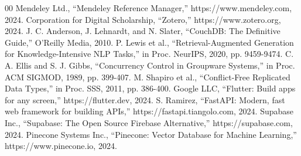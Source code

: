 \documentclass[conference]{IEEEtran}
\begin{document}
\begin{thebibliography}{00}
 Mendeley Ltd., ``Mendeley Reference Manager,'' https://www.mendeley.com, 2024.
 Corporation for Digital Scholarship, ``Zotero,'' https://www.zotero.org, 2024.
 J. C. Anderson, J. Lehnardt, and N. Slater, ``CouchDB: The Definitive Guide,'' O'Reilly Media, 2010.
 P. Lewis et al., ``Retrieval-Augmented Generation for Knowledge-Intensive NLP Tasks,'' in Proc. NeurIPS, 2020, pp. 9459-9474.
 C. A. Ellis and S. J. Gibbs, ``Concurrency Control in Groupware Systems,'' in Proc. ACM SIGMOD, 1989, pp. 399-407.
 M. Shapiro et al., ``Conflict-Free Replicated Data Types,'' in Proc. SSS, 2011, pp. 386-400.
 Google LLC, ``Flutter: Build apps for any screen,'' https://flutter.dev, 2024.
 S. Ramirez, ``FastAPI: Modern, fast web framework for building APIs,'' https://fastapi.tiangolo.com, 2024.
 Supabase Inc., ``Supabase: The Open Source Firebase Alternative,'' https://supabase.com, 2024.
 Pinecone Systems Inc., ``Pinecone: Vector Database for Machine Learning,'' https://www.pinecone.io, 2024.
\end{thebibliography}
\end{document}
